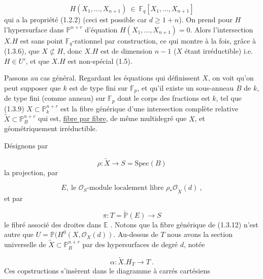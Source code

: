 \begin{equation}\tag{1.3.8}
H(X_1,\dots,X_{n+1}) \ \in \ \mathbb{F}_q[X_1,\dots, X_{n+1}]
\end{equation}
qui a la propriété (1.2.2) (ceci est possible car $d \geq 1+n$). On prend pour $H$ l'hypersurface dans $\mathbb{P}^{n+r}$ d'équation $H(X_1,\dots,X_{n+1}) = 0$. Alors
l'intersection $X.H$ est sans point $\mathbb{F}_q$-rationnel par construction, ce qui montre à la fois, grâce à (1.3.6), que $X \not\subset H$, donc $X.H$ est de dimension $n-1$ ($X$ étant irréductible) i.e. $H \in U'$, et que $X.H$ est non-spécial (1.5).

Passons au cas général. Regardant les équations qui définissent $X$, on voit qu'on peut supposer que $k$ est de type fini sur $\mathbb{F}_p$, et qu'il existe un sous-anneau $B$ de $k$, de type fini (comme anneau) sur $\mathbb{F}_p$ dont le corps des fractions est $k$, tel que (1.3.9) $X \subset \mathbb{P}^{n+r}_k$ est la fibre générique d'une intersection complète relative $\widetilde{X} \subset \mathbb{P}^{n+r}_B$ qui est, \underline{fibre par fibre}, de même multidegré que $X$, et géométriquement irréductible.

Désignons par

\begin{equation}\tag{1.3.10}
\rho : \widetilde{X} \longrightarrow S = \mathrm{Spec}(B)
\end{equation}
la projection, par

\begin{equation}\tag{1.3.11}
E, \ \mbox{le } \mathcal{O}_S\mbox{-module localement libre } \rho_*\mathcal{O}_{\widetilde{X}}(d) \ ,
\end{equation}
et par

\begin{equation}\tag{1.3.12}
\pi : T = \check{\mathbb{P}}(E) \longrightarrow S
\end{equation}
le fibré associé des droites dans $\mathbb{E}$ . Notons que la fibre générique de (1.3.12) n'est autre que $U = \mathbb{P}(H^0(X,\mathcal{O}_X(d))$. Au-dessus de $T$ nous avons la section universelle de $\widetilde{X} \subset \mathbb{P}^{n+r}_B$ par des hypersurfaces de degré $d$, notée 



\begin{equation}\tag{1.3.13}
 \alpha : \widetilde{X}.H_T \longrightarrow T \ .
\end{equation}
Ces copstructions s'insèrent dans le diagramme à carrés cartésiens

